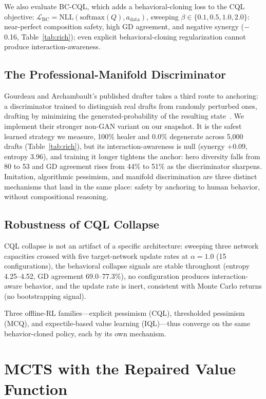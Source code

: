 \documentclass[journal]{IEEEtran}
\begin{document}
We also evaluate BC-CQL, which adds a behavioral-cloning loss to the CQL objective: $\mathcal{L}_\text{BC} = \text{NLL}(\text{softmax}(Q), a_\text{data})$, sweeping $\beta \in \{0.1, 0.5, 1.0, 2.0\}$: near-perfect composition safety, high GD agreement, and negative synergy ($-$0.16, Table~\ref{tab:rich}); even explicit behavioral-cloning regularization cannot produce interaction-awareness.

\subsection{The Professional-Manifold Discriminator}

Gourdeau and Archambault's published drafter takes a third route to anchoring: a discriminator trained to distinguish real drafts from randomly perturbed ones, drafting by minimizing the generated-probability of the resulting state~\cite{gourdeau2021discriminative}. We implement their stronger non-GAN variant on our snapshot. It is the safest learned strategy we measure, 100\% healer and 0.0\% degenerate across 5{,}000 drafts (Table~\ref{tab:rich}), but its interaction-awareness is null (synergy +0.09, entropy 3.96), and training it longer tightens the anchor: hero diversity falls from 80 to 53 and GD agreement rises from 44\% to 51\% as the discriminator sharpens. Imitation, algorithmic pessimism, and manifold discrimination are three distinct mechanisms that land in the same place: safety by anchoring to human behavior, without compositional reasoning.

\subsection{Robustness of CQL Collapse}

CQL collapse is not an artifact of a specific architecture: sweeping three network capacities crossed with five target-network update rates at $\alpha = 1.0$ (15 configurations), the behavioral collapse signals are stable throughout (entropy 4.25--4.52, GD agreement 69.0--77.3\%), no configuration produces interaction-aware behavior, and the update rate is inert, consistent with Monte Carlo returns (no bootstrapping signal).

Three offline-RL families---explicit pessimism (CQL), thresholded pessimism (MCQ), and expectile-based value learning (IQL)---thus converge on the same behavior-cloned policy, each by its own mechanism.

\section{MCTS with the Repaired Value Function}
\label{sec:mcts}
\end{document}
